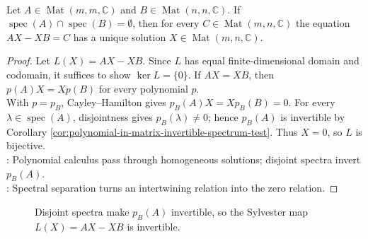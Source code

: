 \begin{theorem} \label{thm:sylvester-linear-matrix-equation} \\
Let $A\in\operatorname{Mat}(m,m,\mathbb{C})$ and $B\in\operatorname{Mat}(n,n,\mathbb{C})$. If $\operatorname{spec}(A)\cap\operatorname{spec}(B)=\emptyset$, then for every $C\in\operatorname{Mat}(m,n,\mathbb{C})$ the equation $AX-XB=C$ has a unique solution $X\in\operatorname{Mat}(m,n,\mathbb{C})$.
\begin{proof}
Let $L(X)=AX-XB$. Since $L$ has equal finite-dimensional domain and codomain, it suffices to show $\ker L=\{0\}$. If $AX=XB$, then $p(A)X=Xp(B)$ for every polynomial $p$. \\
With $p=p_B$, Cayley--Hamilton gives $p_B(A)X=Xp_B(B)=0$. For every $\lambda\in\operatorname{spec}(A)$, disjointness gives $p_B(\lambda)\neq0$; hence $p_B(A)$ is invertible by Corollary \ref{cor:polynomial-in-matrix-invertible-spectrum-test}. Thus $X=0$, so $L$ is bijective.\\
: Polynomial calculus pass through homogeneous solutions; disjoint spectra invert $p_B(A)$.\\
: Spectral separation turns an intertwining relation into the zero relation.
\end{proof}
\end{theorem}

\begin{figure}[H]
  \centering
  
  \caption{Disjoint spectra make $p_B(A)$ invertible, so the Sylvester map $L(X)=AX-XB$ is invertible.}
  \label{fig:sylvester-equation-spectral-gap}
\end{figure}

